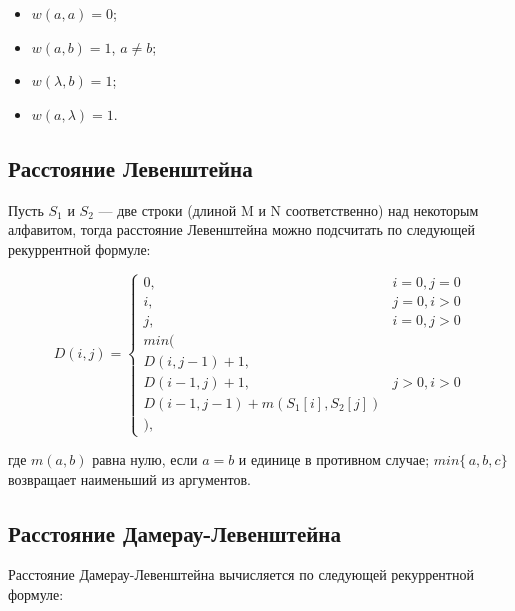\documentclass[14pt,russian]{scrartcl}
\begin{document}
\begin{itemize}
	\item $w(a, a) = 0$;
	\item $w(a, b) = 1$, $a \neq b$;
	\item $w(\lambda, b) = 1$;
	\item $w(a, \lambda) = 1$.
\end{itemize}

\subsection{Расстояние Левенштейна}

Пусть $S_{1}$ и $S_{2}$ — две строки (длиной M и N соответственно) над некоторым алфавитом, тогда расстояние Левенштейна можно подсчитать по следующей рекуррентной формуле:

\begin{displaymath}
	D(i,j) = \left\{ \begin{array}{ll}
	0, & \textrm{$i = 0, j = 0$}\\
	i, & \textrm{$j = 0, i > 0$}\\
	j, & \textrm{$i = 0, j > 0$}\\
	min(\\
	D(i,j-1)+1,\\
	D(i-1, j) +1, &\textrm{$j>0, i>0$}\\
	D(i-1, j-1) + m(S_{1}[i], S_{2}[j])\\
	),
	\end{array} \right.
\end{displaymath}

\noindent
где $m(a,b)$ равна нулю, если $a=b$ и единице в противном случае; $min\{\,a,b,c\}$ возвращает наименьший из аргументов.

\subsection{Расстояние Дамерау-Левенштейна}

Расстояние Дамерау-Левенштейна вычисляется по следующей рекуррентной формуле:
		    
\end{document}
